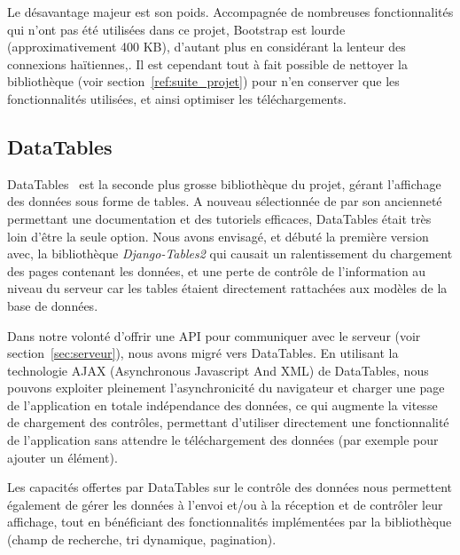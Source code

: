 \documentclass{EPL-master-thesis-covers-FR}
\begin{document}
				Le désavantage majeur est son poids. Accompagnée de nombreuses fonctionnalités qui n'ont pas été utilisées dans ce projet, Bootstrap est lourde (approximativement 400 KB), d'autant plus en considérant la lenteur des connexions haïtiennes,. Il est cependant tout à fait possible de nettoyer la bibliothèque (voir section~\ref{ref:suite_projet}) pour n'en conserver que les fonctionnalités utilisées, et ainsi optimiser les téléchargements.

			\subsection*{DataTables}

				DataTables~\cite{ref:datatables} est la seconde plus grosse bibliothèque du projet, gérant l'affichage des données sous forme de tables. A nouveau sélectionnée de par son ancienneté permettant une documentation et des tutoriels efficaces, DataTables était très loin d'être la seule option. Nous avons envisagé, et débuté la première version avec, la bibliothèque \emph{Django-Tables2} qui causait un ralentissement du chargement des pages contenant les données, et une perte de contrôle de l'information au niveau du serveur car les tables étaient directement rattachées aux modèles de la base de données.

				Dans notre volonté d'offrir une API pour communiquer avec le serveur (voir section~\ref{sec:serveur}), nous avons migré vers DataTables. En utilisant la technologie AJAX (Asynchronous Javascript And XML) de DataTables, nous pouvons exploiter pleinement l'asynchronicité du navigateur et charger une page de l'application en totale indépendance des données, ce qui augmente la vitesse de chargement des contrôles, permettant d'utiliser directement une fonctionnalité de l'application sans attendre le téléchargement des données (par exemple pour ajouter un élément).

				Les capacités offertes par DataTables sur le contrôle des données nous permettent également de gérer les données à l'envoi et/ou à la réception et de contrôler leur affichage, tout en bénéficiant des fonctionnalités implémentées par la bibliothèque (champ de recherche, tri dynamique, pagination).
\end{document}
